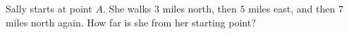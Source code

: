 Sally starts at point $A$. She walks $3$ miles north, then $5$ miles east, and then $7$ miles north again. How far is she from her starting point?
